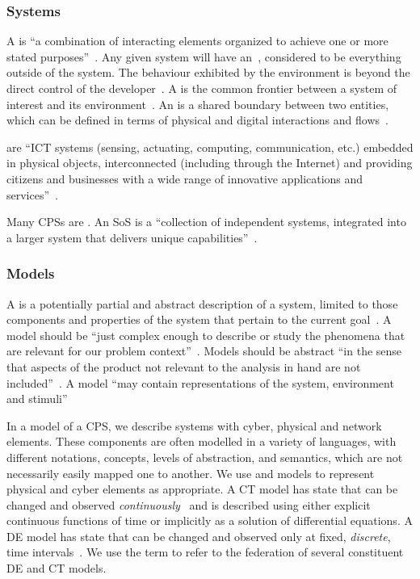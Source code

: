 \subsubsection{Systems}
\label{sec:concepts:systems}
A  is ``a combination of interacting elements organized to achieve one or more stated purposes''~\cite{INCOSEseh15}. Any given system will have an~, considered to be everything outside of the system. The behaviour exhibited by the environment is beyond the direct control of the developer~\cite{Broenink&12b}. A  is the common frontier between a system of interest and its environment~\cite{Broenink&12b}. An  is a shared boundary between two entities, which can be defined in terms of physical and digital interactions and flows~\cite{INCOSEseh15}.

 are ``ICT systems (sensing, actuating, computing, communication, etc.) embedded in physical objects, interconnected (including through the Internet) and providing citizens and businesses with a wide range of innovative applications and services''~\cite{Thompson13, Deka&15}. 

Many CPSs are . An SoS is a ``collection of independent systems, integrated into a larger system that delivers unique capabilities''~\cite{INCOSEsosprimer18}.


\subsubsection{Models}
\label{sec:concepts:models}

A  is a  potentially partial and abstract description of a system, limited to those components and properties of the system that pertain to the current goal~\cite{Holt&14}. A model should be ``just complex enough to describe or study the phenomena that are relevant for our problem context''~\cite{Amerongen10}. Models should be abstract ``in the sense that aspects of the product not relevant to the analysis in hand are not included''~\cite{Fitzgerald&98b}. A model ``may contain representations of the system, environment and stimuli''~\cite{Fitzgerald&14c}

In a model of a CPS, we describe systems with cyber, physical and network elements. These components are often modelled in a variety of languages, with different notations, concepts, levels of abstraction, and semantics, which are not necessarily easily mapped one to another. We use  and  models to represent physical and cyber elements as appropriate. A CT model has state that can be changed and observed \emph{continuously}~\cite{Amerongen10} and is described using either explicit continuous functions of time or implicitly as a solution of differential equations. A DE model has state that can be changed and observed only at fixed, \emph{discrete}, time intervals~\cite{Amerongen10}.  We use the term  to refer to the federation of several constituent DE and CT models.

